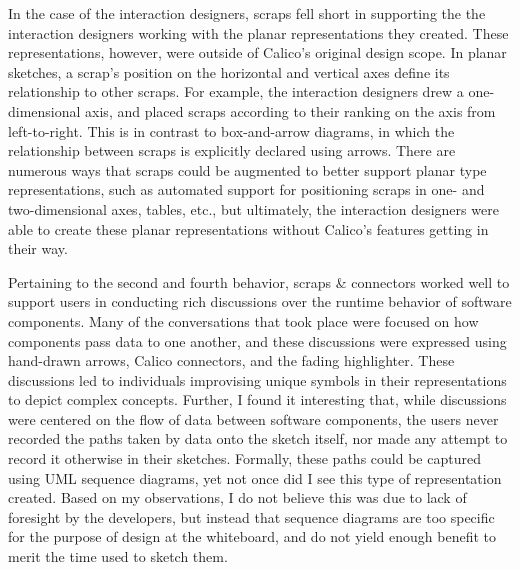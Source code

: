 In the case of the interaction designers, scraps fell short in supporting the the interaction designers working with the planar representations they created. These representations, however, were outside of Calico's original design scope. In planar sketches, a scrap's position on the horizontal and vertical axes define its relationship to other scraps. For example, the interaction designers drew a one-dimensional axis, and placed scraps according to their ranking on the axis from left-to-right. This is in contrast to box-and-arrow diagrams, in which the relationship between scraps is explicitly declared using arrows. There are numerous ways that scraps could be augmented to better support planar type representations, such as automated support for positioning scraps in one- and two-dimensional axes, tables, etc., but ultimately, the interaction designers were able to create these planar representations without Calico's features getting in their way. 

Pertaining to the second and fourth behavior, scraps \& connectors worked well to support users in conducting rich discussions over the runtime behavior of software components. Many of the conversations that took place were focused on how components pass data to one another, and these discussions were expressed using hand-drawn arrows, Calico connectors, and the fading highlighter. These discussions led to individuals improvising unique symbols in their representations to depict complex concepts. Further, I found it interesting that, while discussions were centered on the flow of data between software components, the users never recorded the paths taken by data onto the sketch itself, nor made any attempt to record it otherwise in their sketches. Formally, these paths could be captured using UML sequence diagrams, yet not once did I see this type of representation created. Based on my observations, I do not believe this was due to lack of foresight by the developers, but instead that sequence diagrams are too specific for the purpose of design at the whiteboard, and do not yield enough benefit to merit the time used to sketch them.


